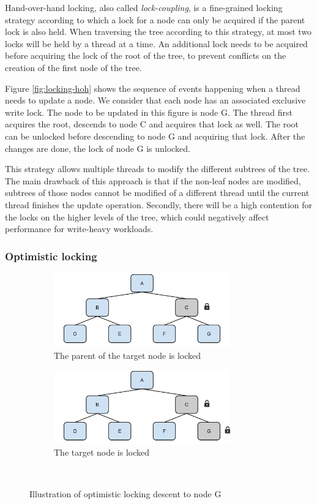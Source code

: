 \documentclass[11pt,a4paper]{globis-book}
\begin{document}
Hand-over-hand locking, also called \textit{lock-coupling}, is a fine-grained locking strategy according to which a lock for a node can only be acquired if the parent lock is also held. When traversing the tree according to this strategy, at most two locks will be held by a thread at a time. An additional lock needs to be acquired before acquiring the lock of the root of the tree, to prevent conflicts on the creation of the first node of the tree. 

Figure \ref{fig:locking-hoh} shows the sequence of events happening when a thread needs to update a node. We consider that each node has an associated exclusive write lock. The node to be updated in this figure is node G. The thread first acquires the root, descends to node C and acquires that lock as well. The root can be unlocked before descending to node G and acquiring that lock. After the changes are done, the lock of node G is unlocked.

This strategy allows multiple threads to modify the different subtrees of the tree. The main drawback of this approach is that if the non-leaf nodes are modified, subtrees of those nodes cannot be modified of a different thread until the current thread finishes the update operation. Secondly, there will be a high contention for the locks on the higher levels of the tree, which could negatively affect performance for write-heavy workloads. 

\subsubsection{Optimistic locking}

\begin{figure}
    \centering
    \begin{subfigure}[b]{0.5\linewidth}
        \includegraphics[width = 3in]{images/Tree-HoH-c}
        \caption{The parent of the target node is locked}
    \end{subfigure}%
    \begin{subfigure}[b]{0.5\linewidth}
        \includegraphics[width = 3in]{images/Tree-HoH-d}
        \caption{The target node is locked}
    \end{subfigure}
    \caption{Illustration of optimistic locking descent to node G}\
    \label{fig:locking-ol}
\end{figure}
\end{document}
